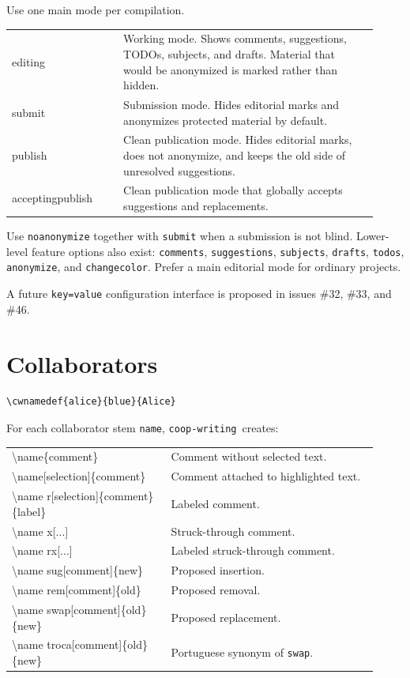 \documentclass[11pt]{article}
\newcommand{\pkg}{\texttt{coop-writing}}
\newcommand{\opt}[1]{\texttt{#1}}
\begin{document}
Use one main mode per compilation.

\begin{longtable}{>{\ttfamily}p{0.28\linewidth}p{0.64\linewidth}}
editing &
Working mode. Shows comments, suggestions, TODOs, subjects, and drafts. Material that would be anonymized is marked rather than hidden.\\
submit &
Submission mode. Hides editorial marks and anonymizes protected material by default.\\
publish &
Clean publication mode. Hides editorial marks, does not anonymize, and keeps the old side of unresolved suggestions.\\
acceptingpublish &
Clean publication mode that globally accepts suggestions and replacements.\\
\end{longtable}

Use \opt{noanonymize} together with \opt{submit} when a submission is not blind. Lower-level feature options also exist: \opt{comments}, \opt{suggestions}, \opt{subjects}, \opt{drafts}, \opt{todos}, \opt{anonymize}, and \opt{changecolor}. Prefer a main editorial mode for ordinary projects.

A future \texttt{key=value} configuration interface is proposed in issues \#32, \#33, and \#46.

\section*{Collaborators}

\begin{verbatim}
\cwnamedef{alice}{blue}{Alice}
\end{verbatim}

For each collaborator stem \texttt{name}, \pkg\ creates:

\begin{longtable}{>{\ttfamily\raggedright\arraybackslash}p{0.40\linewidth}p{0.52\linewidth}}
\textbackslash name\{comment\} & Comment without selected text.\\
\textbackslash name[selection]\{comment\} & Comment attached to highlighted text.\\
\textbackslash name r[selection]\{comment\}\{label\} & Labeled comment.\\
\textbackslash name x[...] & Struck-through comment.\\
\textbackslash name rx[...] & Labeled struck-through comment.\\
\textbackslash name sug[comment]\{new\} & Proposed insertion.\\
\textbackslash name rem[comment]\{old\} & Proposed removal.\\
\textbackslash name swap[comment]\{old\}\{new\} & Proposed replacement.\\
\textbackslash name troca[comment]\{old\}\{new\} & Portuguese synonym of \texttt{swap}.\\
\end{longtable}
\end{document}
